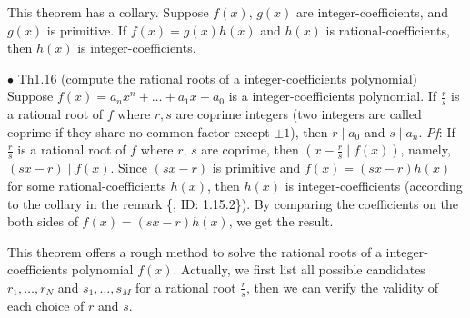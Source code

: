 \documentclass{article}
\begin{document}
\begin{Rmk}{}
    This theorem has a collary. \textcolor{Th}{Suppose $f(x)$, $g(x)$ are integer-coefficients, and $g(x)$ is primitive. If $f(x) = g(x)h(x)$ and $h(x)$ is rational-coefficients, then $h(x)$ is integer-coefficients.}
\end{Rmk}

\begin{Th}{$\bullet$ Th1.16 (compute the rational roots of a integer-coefficients polynomial)}
    Suppose $f(x)=a_nx^n + \dots + a_1x +a_0$ is a integer-coefficients polynomial. If $\frac{r}{s}$ is a rational root of $f$ where $r,s$ are coprime integers (two integers are called coprime if they share no common factor except $\pm 1$), then $r\mid a_0$ and $s\mid a_n$.
    \tcblower
    \textit{Pf}: If $\frac{r}{s}$ is a rational root of $f$ where $r$, $s$ are coprime, then $(x-\frac{r}{s}\mid f(x))$, namely, $(sx-r)\mid f(x)$. Since $(sx-r)$ is primitive and $f(x) = (sx-r)h(x)$ for some rational-coefficients $h(x)$, then $h(x)$ is integer-coefficients (according to the collary in the remark \{, ID: 1.15.2\}). By comparing the coefficients on the both sides of $f(x) = (sx-r)h(x)$, we get the result.  
\end{Th}

\begin{Rmk}{}
    This theorem offers a rough method to solve the rational roots of a integer-coefficients polynomial $f(x)$. Actually, we first list all possible candidates $r_1, \dots, r_N$ and $s_1, \dots, s_M$ for a rational root $\frac{r}{s}$, then we can verify the validity of each choice of $r$ and $s$.
\end{Rmk}
\end{document}
